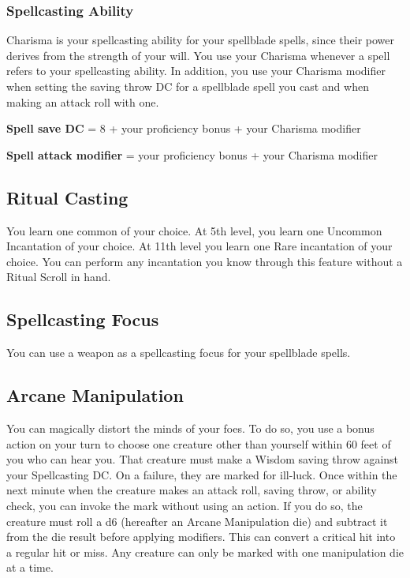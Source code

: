 \subsubsection{Spellcasting Ability}

Charisma is your spellcasting ability for your spellblade spells, since their power derives from the strength of your will. You use your Charisma whenever a spell refers to your spellcasting ability. In addition, you use your Charisma modifier when setting the saving throw DC for a spellblade spell you cast and when making an attack roll with one.

\textbf{Spell save DC} = 8 + your proficiency bonus + your Charisma modifier

\textbf{Spell attack modifier} = your proficiency bonus + your Charisma modifier

\subsection{Ritual Casting}

You learn one common  of your choice. At 5th level, you learn one Uncommon Incantation of your choice. At 11th level you learn one Rare incantation of your choice. You can perform any incantation you know through this feature without a Ritual Scroll in hand.

\subsection{Spellcasting Focus}

You can use a weapon as a spellcasting focus for your spellblade spells.

\subsection{Arcane Manipulation}

You can magically distort the minds of your foes. To do so, you use a bonus action on your turn to choose one creature other than yourself within 60 feet of you who can hear you. That creature must make a Wisdom saving throw against your Spellcasting DC. On a failure, they are marked for ill-luck. Once within the next minute when the creature makes an attack roll, saving throw, or ability check, you can invoke the mark without using an action. If you do so, the creature must roll a d6 (hereafter an Arcane Manipulation die) and subtract it from the die result before applying modifiers. This can convert a critical hit into a regular hit or miss. Any creature can only be marked with one manipulation die at a time.

